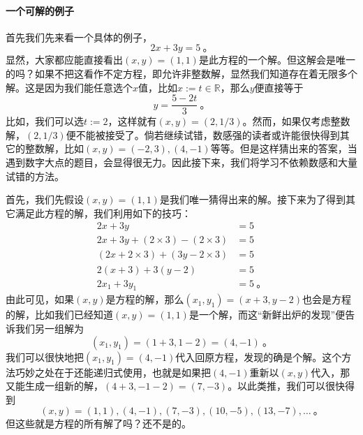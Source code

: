 \documentclass[a4,12pt]{article}
\begin{document}
\paragraph{一个可解的例子}
	首先我们先来看一个具体的例子，
	\[ 2x+3y=5 \ \mbox{。} \]
	显然，大家都应能直接看出$(x, y) = (1, 1)$是此方程的一个解。但这解会是唯一的吗？如果不把这看作不定方程，即允许非整数解，显然我们知道存在着无限多个解。这是因为我们能任意选个$x$值，比如$x:=t\in\mathbb{R}$，那么$y$便直接等于
	\[ y = \frac{5-2t}{3} \ \mbox{。} \]
	比如，我们可以选$t:=2$，这样就有$(x, y) = (2, 1/3)$。然而，如果仅考虑整数解，$(2, 1/3)$便不能被接受了。倘若继续试错，数感强的读者或许能很快得到其它的整数解，比如$(x, y) = (-2, 3), (4, -1)$等等。但是这样猜出来的答案，当遇到数字大点的题目，会显得很无力。因此接下来，我们将学习不依赖数感和大量试错的方法。

	首先，我们先假设$(x, y) = (1, 1)$是我们唯一猜得出来的解。接下来为了得到其它满足此方程的解，我们利用如下的技巧：
	\[ \begin{aligned}
			2x + 3y &= 5 \\
			2x  +3y + (2\times3) - (2\times3) &= 5 \\
			(2x + 2\times3) + (3y - 2\times3) &= 5 \\
			2(x+3) + 3(y-2) &= 5 \\
			2x_1 + 3y_1 &= 5 \ \mbox{。}
		\end{aligned}
	\]
	由此可见，如果$(x, y)$是方程的解，那么$(x_1, y_1) = (x+3, y-2)$也会是方程的解，比如我们已经知道$(x,y)=(1,1)$是一个解，而这“新鲜出炉的发现”便告诉我们另一组解为
	\[(x_1, y_1) = (1+3, 1-2) = (4, -1) \ \mbox{。} \]
	我们可以很快地把$(x_1, y_1) = (4, -1)$代入回原方程，发现的确是个解。这个方法巧妙之处在于还能递归式使用，也就是如果把$(4, -1)$重新以$(x, y)$代入，那又能生成一组新的解，$(4+3, -1-2) = (7,-3)$。以此类推，我们可以很快得到
	\[ (x, y) = (1,1), (4,-1), (7,-3), (10,-5), (13,-7), \ldots \ \mbox{。} \]
	但这些就是方程的所有解了吗？还不是的。
\end{document}
